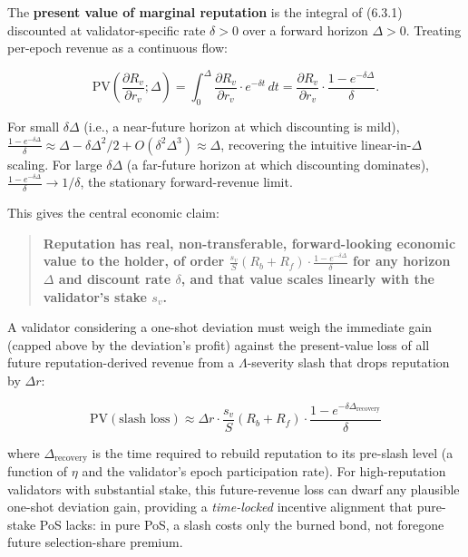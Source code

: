 \documentclass[
  11pt,
]{article}
\begin{document}
The \textbf{present value of marginal reputation} is the integral of
(6.3.1) discounted at validator-specific rate \(\delta > 0\) over a
forward horizon \(\Delta > 0\). Treating per-epoch revenue as a
continuous flow:

\[\text{PV}\left(\frac{\partial R_v}{\partial r_v}; \Delta\right) = \int_0^{\Delta} \frac{\partial R_v}{\partial r_v} \cdot e^{-\delta t} \, dt = \frac{\partial R_v}{\partial r_v} \cdot \frac{1 - e^{-\delta \Delta}}{\delta}. \tag{6.3.2}\]

For small \(\delta\Delta\) (i.e., a near-future horizon at which
discounting is mild),
\(\frac{1 - e^{-\delta\Delta}}{\delta} \approx \Delta - \delta\Delta^2/2 + O(\delta^2 \Delta^3) \approx \Delta\),
recovering the intuitive linear-in-\(\Delta\) scaling. For large
\(\delta\Delta\) (a far-future horizon at which discounting dominates),
\(\frac{1 - e^{-\delta\Delta}}{\delta} \to 1/\delta\), the stationary
forward-revenue limit.

This gives the central economic claim:

\begin{quote}
\textbf{Reputation has real, non-transferable, forward-looking economic
value to the holder, of order
\(\frac{s_v}{S}(R_b + R_f) \cdot \frac{1 - e^{-\delta\Delta}}{\delta}\)
for any horizon \(\Delta\) and discount rate \(\delta\), and that value
scales linearly with the validator's stake \(s_v\).}
\end{quote}

A validator considering a one-shot deviation must weigh the immediate
gain (capped above by the deviation's profit) against the present-value
loss of all future reputation-derived revenue from a
\(\Lambda\)-severity slash that drops reputation by \(\Delta r\):

\[\text{PV}(\text{slash loss}) \approx \Delta r \cdot \frac{s_v}{S}(R_b + R_f) \cdot \frac{1 - e^{-\delta \Delta_{\text{recovery}}}}{\delta}\]

where \(\Delta_{\text{recovery}}\) is the time required to rebuild
reputation to its pre-slash level (a function of \(\eta\) and the
validator's epoch participation rate). For high-reputation validators
with substantial stake, this future-revenue loss can dwarf any plausible
one-shot deviation gain, providing a \emph{time-locked} incentive
alignment that pure-stake PoS lacks: in pure PoS, a slash costs only the
burned bond, not foregone future selection-share premium.
\end{document}
